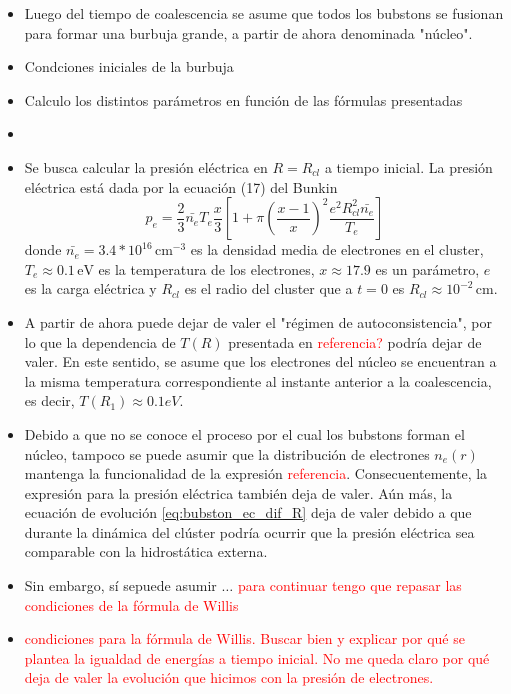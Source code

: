 \documentclass[aps,prb,onecolumn,superscriptaddress,floatfix,longbibliography,10pt]{revtex4-2}
\newcounter{para}
\begin{document}
\begin{itemize}
  \item Luego del tiempo de coalescencia se asume que todos los bubstons se fusionan para formar una burbuja grande, a partir de ahora denominada "núcleo".
  \item Condciones iniciales de la burbuja
  \item Calculo los distintos parámetros en función de las fórmulas presentadas
  \item 
  \item Se busca calcular la presión eléctrica en $R = R_{cl}$ a tiempo inicial. La presión eléctrica está dada por la ecuación (17) del Bunkin
  \[p_{e} = \frac{2}{3}\bar{n_e} T_e \frac{x}{3} \left [1 + \pi \left ( \frac{x-1}{x} \right )^2 \frac{e^2R_{cl}^2\bar{n_e}}{T_e}   \right ] \]
  donde $\bar{n_e} = 3.4 *10^{16} \, \mathrm{cm}^{-3}$ es la densidad media de electrones en el cluster, $T_e \approx 0.1 \, \mathrm{eV}$ es la temperatura de los electrones, $x \approx 17.9$ es un parámetro, $e$ es la carga eléctrica y $R_{cl}$ es el radio del cluster que a $t=0$ es $R_{cl} \approx 10^{-2} \, \mathrm{cm}$.  

  \item A partir de ahora puede dejar de valer el "régimen de autoconsistencia", por lo que la dependencia de $T(R)$ presentada en \textcolor{red}{referencia?} podría dejar de valer. En este sentido, se asume que los electrones del núcleo se encuentran a la misma temperatura correspondiente al instante anterior a la coalescencia, es decir, $T(R_1) \approx 0.1 eV$.



  \item Debido a que no se conoce el proceso por el cual los bubstons forman el núcleo, tampoco se puede asumir que la distribución de electrones $n_e(r)$ mantenga la funcionalidad de la expresión \textcolor{red}{referencia}. Consecuentemente, la expresión para la presión eléctrica también deja de valer. Aún más, la ecuación de evolución \ref{eq:bubston_ec_dif_R} deja de valer debido a que durante la dinámica del clúster podría ocurrir que la presión eléctrica sea comparable con la hidrostática externa. 

  \item Sin embargo, sí sepuede asumir $\dots$ \textcolor{red}{para continuar tengo que repasar las condiciones de la fórmula de Willis}
  \item \textcolor{red}{condiciones para la fórmula de Willis. Buscar bien y explicar por qué se plantea la igualdad de energías a tiempo inicial. No me queda claro por qué deja de valer la evolución que hicimos con la presión de electrones.}


\end{itemize}
\end{document}
